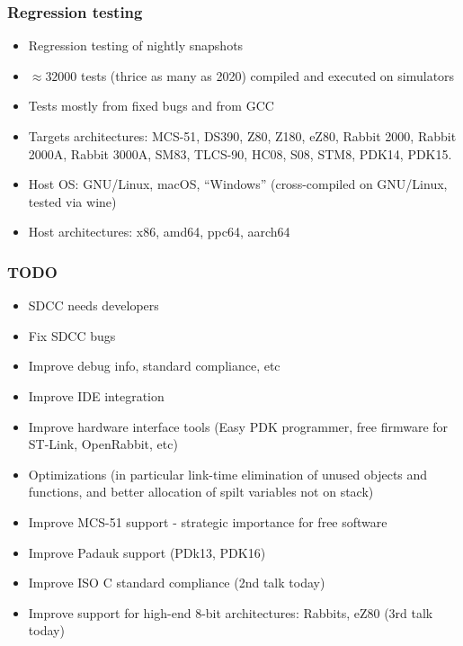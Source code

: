 \documentclass[xcolor=dvipsnames]{beamer}
\begin{document}
\begin{frame}
	\frametitle{Regression testing}
	\begin{itemize}
		\item Regression testing of nightly snapshots
		\item $\approx 32000$ tests (thrice as many as 2020) compiled and executed on simulators
		\item Tests mostly from fixed bugs and from GCC
		\item Targets architectures: MCS-51, DS390, Z80, Z180, eZ80, Rabbit 2000, Rabbit 2000A, Rabbit 3000A, SM83, TLCS-90, HC08, S08, STM8, PDK14, PDK15. 
		\item Host OS: GNU/Linux, macOS, ``Windows'' (cross-compiled on GNU/Linux, tested via wine)
		\item Host architectures: x86, amd64, ppc64, aarch64
	\end{itemize}
\end{frame}

\begin{frame}
	\frametitle{TODO}
	\begin{itemize}
		\item SDCC needs developers
		\item Fix SDCC bugs
		\item Improve debug info, standard compliance, etc
		\item Improve IDE integration
		\item Improve hardware interface tools (Easy PDK programmer, free firmware for ST-Link, OpenRabbit, etc)
		\item Optimizations (in particular link-time elimination of unused objects and functions, and better allocation of spilt variables not on stack)
		\item Improve MCS-51 support - strategic importance for free software
		\item Improve Padauk support (PDk13, PDK16)		
		\item Improve ISO C standard compliance (2nd talk today)
		\item Improve support for high-end 8-bit architectures: Rabbits, eZ80 (3rd talk today)
	\end{itemize}
\end{frame}
\end{document}
